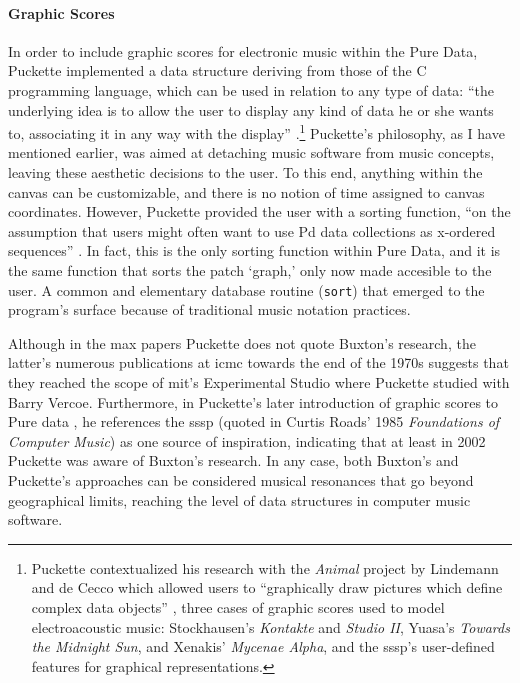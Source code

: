 	\paragraph{Graphic Scores}
	\label{graphic_scores}
	In order to include graphic scores for electronic music within the Pure Data, Puckette implemented a data structure deriving from those of the C programming language, which can be used in relation to any type of data: ``the underlying idea is to allow the user to display any kind of data he or she wants to, associating it in any way with the display'' \parencite[184]{DBLP:conf/icmc/Puckette02}.\footnote{Puckette contextualized his research with the \textit{Animal} project by Lindemann and de Cecco which allowed users to ``graphically draw pictures which define complex data objects'' \parencite{DBLP:conf/icmc/Lindemann90a}, three cases of graphic scores used to model electroacoustic music: Stockhausen's \textit{Kontakte} and \textit{Studio II}, Yuasa's \textit{Towards the Midnight Sun}, and Xenakis' \textit{Mycenae Alpha}, and the \gls{sssp}'s user-defined features for graphical representations.} Puckette's philosophy, as I have mentioned earlier, was aimed at detaching music software from music concepts, leaving these aesthetic decisions to the user. To this end, anything within the canvas can be customizable, and there is no notion of time assigned to canvas coordinates. However, Puckette provided the user with a sorting function, ``on the assumption that users might often want to use Pd data collections as x-ordered sequences'' \parencite[185]{DBLP:conf/icmc/Puckette02}. In fact, this is the only sorting function within Pure Data, and it is the same function that sorts the patch `graph,' only now made accesible to the user. A common and elementary database routine (\texttt{sort}) that emerged to the program's surface because of traditional music notation practices.

	
	Although in the \gls{max} papers Puckette does not quote Buxton's research, the latter's numerous publications at \gls{icmc} towards the end of the 1970s suggests that they reached the scope of \gls{mit}'s Experimental Studio where Puckette studied with Barry Vercoe. Furthermore, in Puckette's later introduction of graphic scores to Pure data \parencite{DBLP:conf/icmc/Puckette02} , he references the \gls{sssp} (quoted in Curtis Roads' 1985 \textit{Foundations of Computer Music}) as one source of inspiration, indicating that at least in 2002 Puckette was aware of Buxton's research. In any case, both Buxton's and Puckette's approaches can be considered musical resonances that go beyond geographical limits, reaching the level of data structures in computer music software.

